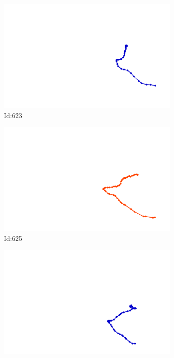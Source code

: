 \documentclass[12pt,twoside]{report}
\begin{document}
\begin{figure}
\begin{subfigure}[b]{0.20\textwidth}
\centering
\includegraphics[width=\textwidth]{../trajectories/623.png}
\caption{Id:623}
\end{subfigure}
\begin{subfigure}[b]{0.20\textwidth}
\centering
\includegraphics[width=\textwidth]{../trajectories/625.png}
\caption{Id:625}
\end{subfigure}
\begin{subfigure}[b]{0.20\textwidth}
\centering
\includegraphics[width=\textwidth]{../trajectories/630.png}

\end{subfigure}
\end{figure}
\end{document}
